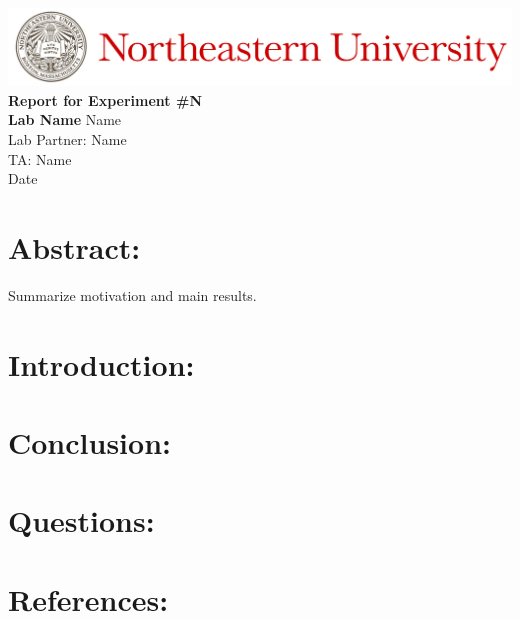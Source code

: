 \documentclass[12pt,a4paper]{article}
\begin{document}
\begin{center}
    \includegraphics[width=\textwidth]{./Images/Header.jpeg}
    \vfill
    \textbf{\Large{Report for Experiment \#N\\
    Lab Name}}
    \vfill
    Name\\
    Lab Partner: Name\\
    TA: Name\\
    Date
    \vfill
\end{center}

\section*{Abstract:}
	Summarize motivation and main results.

\newpage

\section*{Introduction:}
\section*{Conclusion:}
\section*{Questions:}
\section*{References:}
\end{document}
